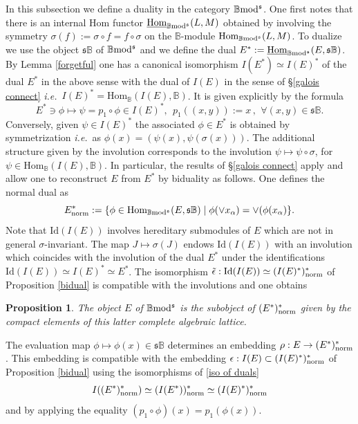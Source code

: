 \documentclass[12pt]{article}
\newtheorem{prop}[thm]{Proposition}
\def\Hom{{\rm Hom}}
\def\Homi{{\underline{\rm Hom}}}
\def\id{{\rm id}}
\def\B{{\mathbb B}}
\def\qqq{\,,\,~\forall}
\newcommand{\ie}{{\it i.e.\/}\ }
\def\id{{\mbox{Id}}}
\def\Hom {{\mbox{Hom}}}
\def\yb{\mathfrak{s}}
\def\b2{{\rm \B mod^{\mathfrak s}}}
\begin{document}
In this subsection we define a duality in the category $\b2$. One first notes that there is an internal Hom functor $\Homi_\b2(L,M)$ obtained by involving the symmetry $\sigma(f):=\sigma\circ f=f\circ \sigma$ on the $\B$-module $\Hom_\b2(L,M)$. To dualize we use the object $\yb\B$ of $\b2$ and we define the dual $E^*:=\Homi_\b2(E,\yb\B)$. By Lemma \ref{forgetful} one has a canonical isomorphism $I(E^*)\simeq I(E)^*$ of the dual $E^*$ in the above sense with the dual of $I(E)$ in the sense of \S\ref{galois connect} \ie $I(E)^*=\Hom_\B(I(E),\B)$. It is given explicitly by the formula
\begin{equation}\label{iso of duals}
	E^*\ni \phi\mapsto \psi =p_1\circ \phi\in I(E)^*, \ \ p_1((x,y)):=x\qqq (x,y)\in \yb\B.
\end{equation}
Conversely, given $\psi\in I(E)^*$ the associated $\phi\in E^*$ is obtained by symmetrization \ie as $\phi(x)=(\psi(x),\psi(\sigma(x)))$.
The additional structure given by the involution corresponds to the involution $\psi \mapsto \psi\circ \sigma$, for  $\psi\in \Hom_\B(I(E),\B)$. In particular, the results of \S\ref{galois connect} apply and allow one to reconstruct $E$ from $E^*$ by biduality  as follows. One defines the normal dual as 
$$
E^*_{\rm norm}:=\{\phi\in \Hom_\b2(E,\yb\B)\mid \phi(\vee x_\alpha)=\vee(\phi(x_\alpha)\}.
$$
Note that $\id(I(E))$ involves hereditary submodules of $E$ which are not in general $\sigma$-invariant.  The map $J\mapsto \sigma(J)$ endows $\id(I(E))$ with an involution which coincides with the involution of the dual $E^*$ under the identifications $\id(I(E))\simeq I(E)^*\simeq E^*$. 
The isomorphism  $\tilde \epsilon: \id(I(E))\simeq (I(E)^*)^*_{\rm norm}$ of Proposition \ref{bidual} is compatible with the involutions and one obtains
 \begin{prop}\label{bidualbmods} The object $E$ of $\b2$ is the subobject of $(E^*)^*_{\rm norm}$ given by the compact elements of this latter complete algebraic lattice.
 \end{prop}
 \proof The evaluation map $\phi\mapsto \phi(x)\in \yb\B$ determines an embedding  $\rho:E\to (E^*)^*_{\rm norm}$. This embedding is compatible with the embedding $\epsilon:I(E)\subset (I(E)^*)^*_{\rm norm}$ of Proposition \ref{bidual} using the isomorphisms of \eqref{iso of duals}  
 $$
  I((E^*)^*_{\rm norm})\simeq (I(E^*))^*_{\rm norm}\simeq  (I(E)^*)^*_{\rm norm}
 $$
 and by applying the equality $(p_1\circ \phi)(x)=p_1(\phi(x))$.
 \endproof 
 
\end{document}

